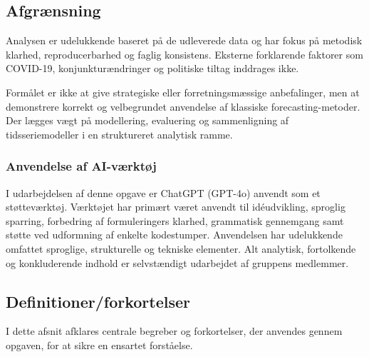 \documentclass[
]{article}
\begin{document}
\subsection{Afgrænsning}\label{afgruxe6nsning}

Analysen er udelukkende baseret på de udleverede data og har fokus på
metodisk klarhed, reproducerbarhed og faglig konsistens. Eksterne
forklarende faktorer som COVID-19, konjunkturændringer og politiske
tiltag inddrages ikke.

Formålet er ikke at give strategiske eller forretningsmæssige
anbefalinger, men at demonstrere korrekt og velbegrundet anvendelse af
klassiske forecasting-metoder. Der lægges vægt på modellering,
evaluering og sammenligning af tidsseriemodeller i en struktureret
analytisk ramme.

\subsubsection{Anvendelse af
AI-værktøj}\label{anvendelse-af-ai-vuxe6rktuxf8j}

I udarbejdelsen af denne opgave er ChatGPT (GPT-4o) anvendt som et
støtteværktøj. Værktøjet har primært været anvendt til idéudvikling,
sproglig sparring, forbedring af formuleringers klarhed, grammatisk
gennemgang samt støtte ved udformning af enkelte kodestumper.
Anvendelsen har udelukkende omfattet sproglige, strukturelle og tekniske
elementer. Alt analytisk, fortolkende og konkluderende indhold er
selvstændigt udarbejdet af gruppens medlemmer.

\subsection{Definitioner/forkortelser}\label{definitionerforkortelser}

I dette afsnit afklares centrale begreber og forkortelser, der anvendes
gennem opgaven, for at sikre en ensartet forståelse.
\end{document}
